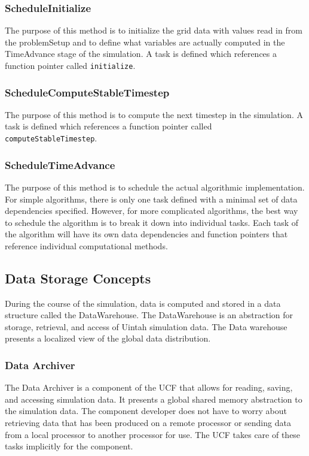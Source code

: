 \documentclass[11pt,fleqn]{book} %
\begin{document}
\subsubsection{ScheduleInitialize}

The purpose of this method is to initialize the grid data with values
read in from the problemSetup and to define what variables are
actually computed in the TimeAdvance stage of the simulation.  A task
is defined which references a function pointer called
\texttt{initialize}.

\subsubsection{ScheduleComputeStableTimestep}

The purpose of this method is to compute the next timestep in the
simulation.  A task is defined which references a function pointer
called \texttt{computeStableTimestep}.

\subsubsection{ScheduleTimeAdvance}

The purpose of this method is to schedule the actual algorithmic
implementation.  For simple algorithms, there is only one task defined
with a minimal set of data dependencies specified.  However, for more
complicated algorithms, the best way to schedule the algorithm is to
break it down into individual tasks.  Each task of the algorithm will
have its own data dependencies and function pointers that reference
individual computational methods.

\subsection{Data Storage Concepts}

During the course of the simulation, data is computed and stored in a
data structure called the DataWarehouse.  The DataWarehouse is an abstraction
for storage, retrieval, and access of Uintah simulation data. The Data warehouse 
presents a localized view of the global data distribution.  

\subsubsection{Data Archiver}

The Data Archiver is a component of the UCF that allows for reading, saving, and accessing simulation data. 
It presents a global shared memory abstraction to the simulation data. The component developer does not have 
to worry about retrieving data that has been produced on a remote processor or sending data from a local processor 
to another processor for use. The UCF takes care of these tasks implicitly for the component. 
\end{document}
